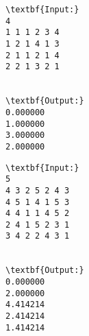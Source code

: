 \begin{verbatim}
\textbf{Input:}
4
1 1 1 2 3 4
1 2 1 4 1 3
2 1 1 2 1 4
2 2 1 3 2 1


\textbf{Output:}
0.000000
1.000000
3.000000
2.000000

\end{verbatim}
\begin{verbatim}
\textbf{Input:}
5
4 3 2 5 2 4 3
4 5 1 4 1 5 3
4 4 1 1 4 5 2
2 4 1 5 2 3 1
3 4 2 2 4 3 1


\textbf{Output:}
0.000000
2.000000
4.414214
2.414214
1.414214

\end{verbatim}
 